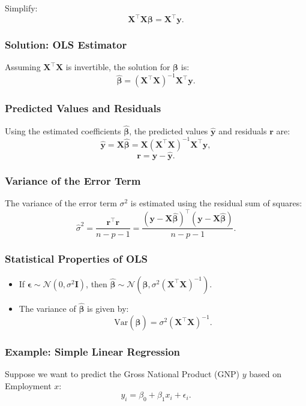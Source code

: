 \documentclass[12pt,a4paper]{article}
\begin{document}
Simplify:
\[
\mathbf{X}^\top \mathbf{X} \boldsymbol{\beta} = \mathbf{X}^\top \mathbf{y}.
\]

\subsubsection{Solution: OLS Estimator}
Assuming \( \mathbf{X}^\top \mathbf{X} \) is invertible, the solution for \( \boldsymbol{\beta} \) is:
\[
\hat{\boldsymbol{\beta}} = (\mathbf{X}^\top \mathbf{X})^{-1} \mathbf{X}^\top \mathbf{y}.
\]

\subsubsection{Predicted Values and Residuals}
Using the estimated coefficients \( \hat{\boldsymbol{\beta}} \), the predicted values \( \hat{\mathbf{y}} \) and residuals \( \mathbf{r} \) are:
\[
\hat{\mathbf{y}} = \mathbf{X} \hat{\boldsymbol{\beta}} = \mathbf{X} (\mathbf{X}^\top \mathbf{X})^{-1} \mathbf{X}^\top \mathbf{y},
\]
\[
\mathbf{r} = \mathbf{y} - \hat{\mathbf{y}}.
\]

\subsubsection{Variance of the Error Term}
The variance of the error term \( \sigma^2 \) is estimated using the residual sum of squares:
\[
\hat{\sigma}^2 = \frac{\mathbf{r}^\top \mathbf{r}}{n - p - 1} = \frac{(\mathbf{y} - \mathbf{X} \hat{\boldsymbol{\beta}})^\top (\mathbf{y} - \mathbf{X} \hat{\boldsymbol{\beta}})}{n - p - 1}.
\]

\subsubsection{Statistical Properties of OLS}
\begin{itemize}
    \item If \( \boldsymbol{\epsilon} \sim \mathcal{N}(0, \sigma^2 \mathbf{I}) \), then \( \hat{\boldsymbol{\beta}} \sim \mathcal{N}(\boldsymbol{\beta}, \sigma^2 (\mathbf{X}^\top \mathbf{X})^{-1}) \).
    \item The variance of \( \hat{\boldsymbol{\beta}} \) is given by:
    \[
    \text{Var}(\hat{\boldsymbol{\beta}}) = \sigma^2 (\mathbf{X}^\top \mathbf{X})^{-1}.
    \]
\end{itemize}

\subsubsection{Example: Simple Linear Regression}
Suppose we want to predict the Gross National Product (GNP) \( y \) based on Employment \( x \):
\[
y_i = \beta_0 + \beta_1 x_i + \epsilon_i.
\]
\end{document}
